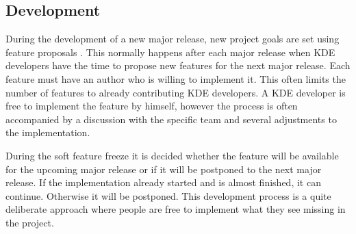 \subsection{Development} %

During the development of a new major release, new project goals are set using
feature proposals \cite{KDEDevelopmentModel,KDEFAQ}. This normally happens
after each major release when KDE developers have the time to propose new
features for the next major release. Each feature must have an author who is
willing to implement it. This often limits the number of features to already
contributing KDE developers. A KDE developer is free to implement the feature
by himself, however the process is often accompanied by a discussion with the
specific team and several adjustments to the implementation.

During the soft feature freeze it is decided whether the feature will be
available for the upcoming major release or if it will be postponed to the next
major release. If the implementation already started and is almost finished, it
can continue. Otherwise it will be postponed. This development process is a
quite deliberate approach where people are free to implement what they see
missing in the project.


